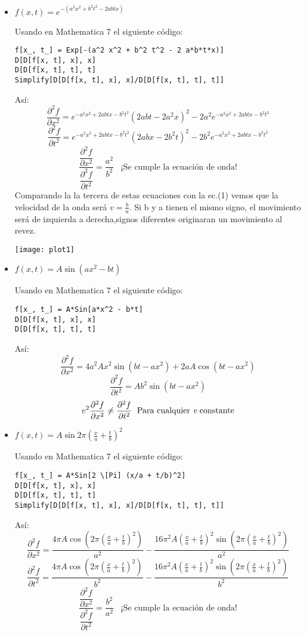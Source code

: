 \documentclass{article}
\begin{document}
\begin{itemize}
\begin{itemize}
\item$f(x,t)= e ^{- \left( a^{2}x^{2}+b^{2}t^{2}-2abtx \right) }$

Usando en Mathematica 7 el siguiente código:
\begin{verbatim}
f[x_, t_] = Exp[-(a^2 x^2 + b^2 t^2 - 2 a*b*t*x)]
D[D[f[x, t], x], x]
D[D[f[x, t], t], t]
Simplify[D[D[f[x, t], x], x]/D[D[f[x, t], t], t]]
\end{verbatim}
Así: 
$$ \frac{\partial^{2}f}{\partial x^{2}} = e^{-a^2 x^2+2 a b t x-b^2 t^2} \left(2 a b t-2 a^2 x\right)^2-2 a^2 e^{-a^2 x^2+2 a b t x-b^2 t^2}$$
$$  \frac{\partial^{2}f}{\partial t^{2}}= e^{-a^2 x^2+2 a b t x-b^2 t^2} \left(2 a b x-2 b^2 t\right)^2-2 b^2 e^{-a^2 x^2+2 a b t x-b^2 t^2}$$
$$ \dfrac{\dfrac{\partial^{2}f}{\partial x^{2}}}{\dfrac{\partial^{2}f}{\partial t^{2}}}= \dfrac{a^{2}}{b^{2}} \; \; \;  \mbox{¡Se cumple la ecuación de onda!}$$
Comparando la la tercera de estas ecuaciones con la ec.(1) vemos que la velocidad de la onda será $v=\frac{b}{a}$. Si b y a tienen el mismo signo, el movimiento será de izquierda a derecha,signos diferentes originaran un movimiento al revez.

  \centering
    \texttt{[image: plot1]}

\item $f(x,t)= A \sin (ax^{2}-bt)$

Usando en Mathematica 7 el siguiente código:
\begin{verbatim}
f[x_, t_] = A*Sin[a*x^2 - b*t]
D[D[f[x, t], x], x]
D[D[f[x, t], t], t]
\end{verbatim}
Así:
$$ \frac{\partial^{2}f}{\partial x^{2}} =4 a^2 A x^2 \sin \left(b t-a x^2\right)+2 a A \cos \left(b t-a x^2\right)$$
$$ \frac{\partial^{2}f}{\partial t^{2}}= A b^2 \sin \left(b t-a x^2\right)$$
$$ v^{2} \frac{\partial^{2}f}{\partial x^{2}} \neq \frac{\partial^{2}f}{\partial t^{2}} \; \mbox{ Para cualquier {\it v} constante} $$

\item $f(x,t)= A \sin 2\pi (\frac{x}{a}+\frac{t}{b})^{2}$

Usando en Mathematica 7 el siguiente código:
\begin{verbatim}
f[x_, t_] = A*Sin[2 \[Pi] (x/a + t/b)^2]
D[D[f[x, t], x], x]
D[D[f[x, t], t], t]
Simplify[D[D[f[x, t], x], x]/D[D[f[x, t], t], t]]
\end{verbatim}
Así: 
$$ \frac{\partial^{2}f}{\partial x^{2}} =  \frac{4 \pi  A \cos \left(2 \pi 
   \left(\frac{x}{a}+\frac{t}{b}\right)^2\right)}{a^2}-\frac{16 \pi
   ^2 A \left(\frac{x}{a}+\frac{t}{b}\right)^2 \sin \left(2 \pi 
   \left(\frac{x}{a}+\frac{t}{b}\right)^2\right)}{a^2}$$
$$  \frac{\partial^{2}f}{\partial t^{2}}= \frac{4 \pi  A \cos \left(2 \pi 
   \left(\frac{x}{a}+\frac{t}{b}\right)^2\right)}{b^2}-\frac{16 \pi
   ^2 A \left(\frac{x}{a}+\frac{t}{b}\right)^2 \sin \left(2 \pi 
   \left(\frac{x}{a}+\frac{t}{b}\right)^2\right)}{b^2} $$
$$ \dfrac{\dfrac{\partial^{2}f}{\partial x^{2}}}{\dfrac{\partial^{2}f}{\partial t^{2}}}= \dfrac{b^{2}}{a^{2}} \; \; \;  \mbox{¡Se cumple la ecuación de onda!}$$


\end{itemize}
\end{itemize}
\end{document}
